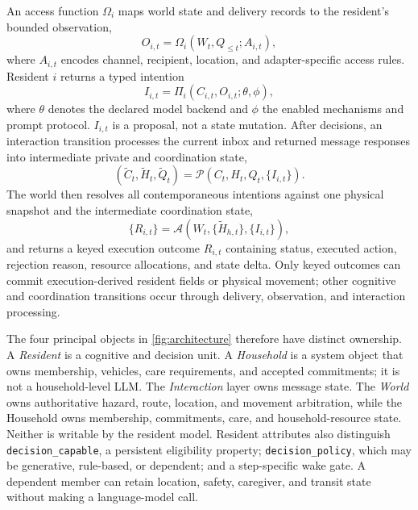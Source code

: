 \documentclass[journal]{IEEEtran}
\begin{document}
An access function $\Omega_i$ maps world state and delivery records to the
resident's bounded observation,
\begin{equation}
  O_{i,t}=\Omega_i(W_t,Q_{\leq t};A_{i,t}),
\end{equation}
where $A_{i,t}$ encodes channel, recipient, location, and adapter-specific
access rules. Resident $i$ returns a typed intention
\begin{equation}
  I_{i,t}=\Pi_i(C_{i,t},O_{i,t};\theta,\phi),
  \label{eq:intention}
\end{equation}
where $\theta$ denotes the declared model backend and $\phi$ the enabled
mechanisms and prompt protocol. $I_{i,t}$ is a proposal, not a state mutation.
After decisions, an interaction transition processes the current inbox and
returned message responses into intermediate private and coordination state,
\begin{equation}
  (\widetilde C_t,\widetilde H_t,\widetilde Q_t)=
  \mathcal{P}(C_t,H_t,Q_t,\{I_{i,t}\}).
  \label{eq:interaction-transition}
\end{equation}
The world then resolves all contemporaneous intentions against one physical
snapshot and the intermediate coordination state,
\begin{equation}
  \{R_{i,t}\}=\mathcal{A}\!\left(W_t,\{\widetilde H_{h,t}\},
  \{I_{i,t}\}\right),
  \label{eq:arbitration}
\end{equation}
and returns a keyed execution outcome $R_{i,t}$ containing status, executed
action, rejection reason, resource allocations, and state delta. Only keyed
outcomes can commit execution-derived resident fields or physical movement;
other cognitive and coordination transitions occur through delivery,
observation, and interaction processing.

The four principal objects in \cref{fig:architecture} therefore have distinct
ownership. A \emph{Resident} is a cognitive and decision unit. A
\emph{Household} is a system object that owns membership, vehicles, care
requirements, and accepted commitments; it is not a household-level LLM. The
\emph{Interaction} layer owns message state. The \emph{World} owns authoritative
hazard, route, location, and movement arbitration, while the Household owns
membership, commitments, care, and household-resource state. Neither is
writable by the resident model. Resident attributes also distinguish
\texttt{decision\_capable}, a persistent eligibility property;
\texttt{decision\_policy}, which may be generative, rule-based, or dependent;
and a step-specific wake gate. A dependent member can retain location, safety,
caregiver, and transit state without making a language-model call.
\end{document}
